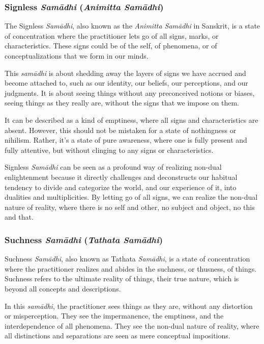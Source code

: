 \documentclass[12pt,openany]{book}
\begin{document}
\subsubsection*{Signless \textit{Samādhi} (\textit{Animitta Samādhi})}

The Signless \textit{Samādhi}, also known as the \textit{Animitta Samādhi} in Sanskrit, is a state of concentration where the practitioner lets go of all signs, marks, or characteristics. These signs could be of the self, of phenomena, or of conceptualizations that we form in our minds.

This \textit{samādhi} is about shedding away the layers of signs we have accrued and become attached to, such as our identity, our beliefs, our perceptions, and our judgments. It is about seeing things without any preconceived notions or biases, seeing things as they really are, without the signs that we impose on them.

It can be described as a kind of emptiness, where all signs and characteristics are absent. However, this should not be mistaken for a state of nothingness or nihilism. Rather, it's a state of pure awareness, where one is fully present and fully attentive, but without clinging to any signs or characteristics.

Signless \textit{Samādhi} can be seen as a profound way of realizing non-dual enlightenment because it directly challenges and deconstructs our habitual tendency to divide and categorize the world, and our experience of it, into dualities and multiplicities. By letting go of all signs, we can realize the non-dual nature of reality, where there is no self and other, no subject and object, no this and that.

\subsubsection*{Suchness \textit{Samādhi} (\textit{Tathata Samādhi})}

Suchness \textit{Samādhi}, also known as Tathata \textit{Samādhi}, is a state of concentration where the practitioner realizes and abides in the suchness, or thusness, of things. Suchness refers to the ultimate reality of things, their true nature, which is beyond all concepts and descriptions.

In this \textit{samādhi}, the practitioner sees things as they are, without any distortion or misperception. They see the impermanence, the \linebreak emptiness, and the interdependence of all phenomena. They see the non-dual nature of reality, where all distinctions and separations are seen as mere conceptual impositions.
\end{document}
